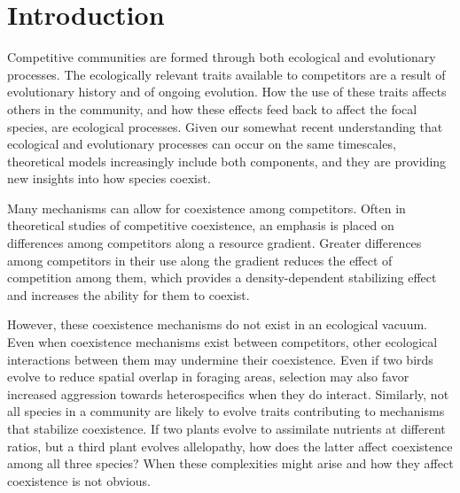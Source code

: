 
\section*{Introduction}


Competitive communities are formed through both ecological and evolutionary processes.
The ecologically relevant traits available to competitors are a result of 
evolutionary history and of ongoing evolution.
How the use of these traits affects others in the community, and
how these effects feed back to affect the focal species,
are ecological processes.
Given our somewhat recent understanding that ecological and evolutionary processes
can occur on the same timescales, theoretical models increasingly
include both components, and they are providing new insights into how species coexist.

Many mechanisms can allow for coexistence among competitors.
Often in theoretical studies of competitive coexistence, 
an emphasis is placed on differences among competitors
along a resource gradient.
Greater differences among competitors in their use along the gradient reduces
the effect of competition among them, which provides a density-dependent 
stabilizing effect and increases the ability for them to coexist.


However, these coexistence mechanisms do not exist in an ecological vacuum.
Even when coexistence mechanisms exist between competitors, other
ecological interactions between them may undermine their coexistence.
Even if two birds evolve to reduce spatial overlap in foraging areas,
selection may also favor increased aggression towards heterospecifics
when they do interact.
Similarly, not all species in a community are likely to evolve
traits contributing to mechanisms that stabilize coexistence.
If two plants evolve to assimilate nutrients at different ratios,
but a third plant evolves allelopathy, 
how does the latter affect coexistence among all three species?
When these complexities might arise and how they affect coexistence is 
not obvious.


